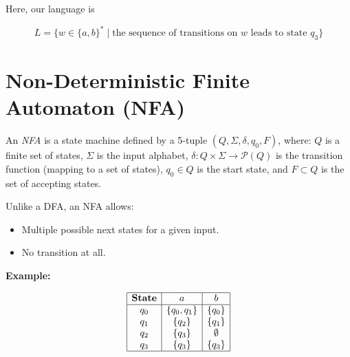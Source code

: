 Here, our language is

\[
    L = \{ w \in \{a,b\}^* \mid \text{the sequence of transitions on } w \text{ leads to state } q_3 \}
\]

\section{Non-Deterministic Finite Automaton (NFA)}  

An \emph{NFA} is a state machine defined by a 5-tuple \((Q, \Sigma, \delta, q_0, F)\), where: 
\(Q\) is a finite set of states, \(\Sigma\) is the input alphabet, 
\(\delta: Q \times \Sigma \to \mathcal{P}(Q)\) is the transition function (mapping to a set of states),
\(q_0 \in Q\) is the start state, and \(F \subset Q\) is the set of accepting states.

Unlike a DFA, an NFA allows:

\begin{itemize}
    
    \item Multiple possible next states for a given input.
    
    \item No transition at all.

\end{itemize}

\textbf{Example:}

\[
    \begin{array}{|c|c|c|}
    \hline
    \textbf{State} & a & b \\
    \hline
    q_0 & \{q_0, q_1\} & \{q_0\} \\
    q_1 & \{q_2\} & \{q_1\} \\
    q_2 & \{q_3\} & \emptyset \\
    q_3 & \{q_3\} & \{q_3\} \\
    \hline
    \end{array}
\]

\begin{center}
\end{center}


